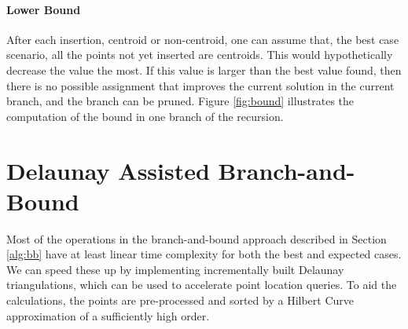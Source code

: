 \paragraph{Lower Bound}
After each insertion, centroid or non-centroid, one can assume that, the best case scenario, all the points not yet inserted are centroids. This would hypothetically decrease the value the most. If this value is larger than the best value found, then there is no possible assignment that improves the current solution in the current branch, and the branch can be pruned. Figure \ref{fig:bound} illustrates the computation of the bound in one branch of the recursion.




\section{Delaunay Assisted Branch-and-Bound}
\label{alg:da}

Most of the operations in the branch-and-bound approach described in Section \ref{alg:bb} have at least linear time complexity for both the best and expected cases. We can speed these up by implementing incrementally built Delaunay triangulations, which can be used to accelerate point location queries. To aid the calculations, the points are pre-processed and sorted by a Hilbert Curve approximation of a sufficiently high order.

